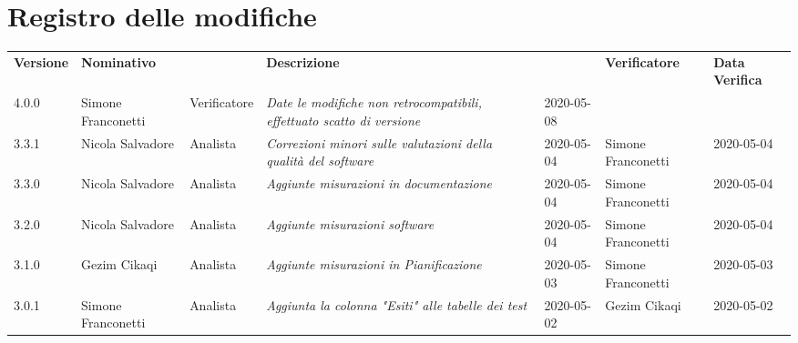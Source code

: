\section*{Registro delle modifiche}
\renewcommand{\arraystretch}{1.8}
 \setlength\LTleft{-1.7cm}
 \begin{longtable}{|p{1.7cm}|p{2cm}|p{2.5cm}|p{3cm}|p{1.7cm}|p{2cm}|p{2.3cm}|}
  \hline
  \rowcolor{header}
  \textbf{Versione} & \textbf{Nominativo} & \centering{\textbf{Ruolo}} & \textbf{Descrizione} &   \centering{\textbf{Data}} & \textbf{Verificatore} & \textbf{Data Verifica} \\
  
  4.0.0 & Simone Franconetti & Verificatore & \small{\textit{Date le modifiche non retrocompatibili, effettuato scatto di versione}} & 2020-05-08 & &\\
  
  3.3.1 & Nicola Salvadore  & Analista & \small{\textit{Correzioni minori sulle valutazioni della qualità del software}} & 2020-05-04 & Simone Franconetti  & 2020-05-04 \\
  3.3.0 & Nicola Salvadore  & Analista & \small{\textit{Aggiunte misurazioni in documentazione}} & 2020-05-04 & Simone Franconetti  & 2020-05-04 \\
  3.2.0 & Nicola Salvadore  & Analista & \small{\textit{Aggiunte misurazioni software}} & 2020-05-04 & Simone Franconetti  & 2020-05-04 \\
  3.1.0 & Gezim Cikaqi  & Analista & \small{\textit{Aggiunte misurazioni in Pianificazione}} & 2020-05-03 & Simone Franconetti  & 2020-05-03 \\
  3.0.1 & Simone Franconetti & Analista & \small{\textit{Aggiunta la colonna "Esiti" alle tabelle dei test}} & 2020-05-02 & Gezim Cikaqi  & 2020-05-02 \\
  

\end{longtable}
